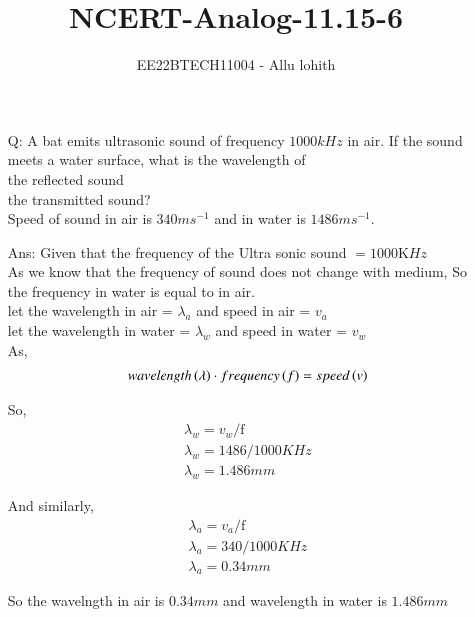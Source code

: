 \documentclass[journal,12pt,twocolumn]{IEEEtran}
\theoremstyle{remark}
\begin{document}

\vspace{3cm}

\title{NCERT-Analog-11.15-6}
\author{EE22BTECH11004 - Allu lohith}

\maketitle
\newpage
\bigskip

\renewcommand{\thefigure}{\theenumi}
\renewcommand{\thetable}{\theenumi}
\begin{enumerate}
\item[Q:] 
A bat emits ultrasonic sound of frequency $1000 kHz$ in air. If the sound meets a water surface, what is the wavelength of\\[0pt] \brak the reflected sound \\[0pt]
 the transmitted sound?\\
Speed of sound in air is $340 ms^{-1}$ and in water is $1486 ms^{-1}$.
\item[Ans:]
Given that the frequency of the Ultra sonic sound $= 1000$K$Hz$\\
As we know that the frequency of sound does not change with medium, So the frequency in water is equal to in air.\\
let the wavelength in air = $\lambda_a$  and  speed in air = $v_a$\\
let the wavelength in water = $\lambda_w$ and  speed in water = $v_w$ \\
As,
\begin{align}
wavelength\left(\lambda\right)\cdot frequency\left(f\right)=speed\left(v\right)
\end{align}

So,
\begin{align}
\lambda_w=v_w/ \mathrm{f}\\
\lambda_w=1486/1000KHz\\
\lambda_w=1.486mm    
\end{align}

And similarly,
\begin{align}
\lambda_a=v_a/\mathrm{f}\\
\lambda_a=340/1000KHz\\
\lambda_a=0.34mm    
\end{align}

So the wavelngth in air is $0.34mm$ and wavelength in water is $1.486mm$

\begin{table}[htbp]
\centering

\vspace{0.2cm}
\caption{\normalsize $Parameters$}
\label{tab:parameters}
\end{table}

\end{enumerate}
\end{document}
